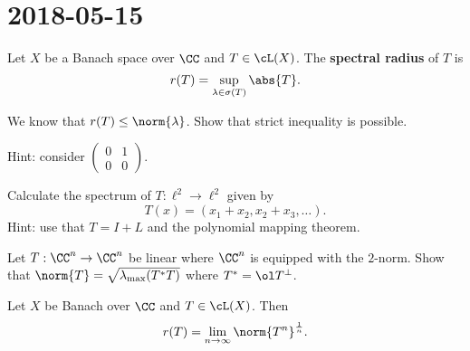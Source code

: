 \section{2018-05-15}

\begin{defn}
  Let $X$ be a Banach space over $\CC$ and $T \in \cL(X)$.
  The \textbf{spectral radius} of $T$ is
  \[ r(T) = \sup_{\lambda\in\sigma(T)}\abs{T}. \]
\end{defn}

\begin{exer}
  We know that $r(T) \leq \norm{\lambda}$.
  Show that strict inequality is possible.

  Hint: consider
  $(\begin{smallmatrix}
    0 & 1 \\ 0 & 0
  \end{smallmatrix})$.
\end{exer}

\begin{exer}
  Calculate the spectrum of $T: \ell^2 \to \ell^2$ given by
  \[ T(x) = (x_1+x_2,x_2+x_3,\ldots).\]
  Hint: use that $T=I+L$ and the polynomial mapping theorem.
\end{exer}

\begin{exer}
  Let $T: \CC^n \to \CC^n$ be linear where $\CC^n$ is equipped with the $2$-norm.
  Show that $\norm{T} = \sqrt{\lambda_{\text{max}}(T^*T)}$ where $T^*=\ol T^\perp$.
\end{exer}

\begin{thm}[Gelfand]
  Let $X$ be Banach over $\CC$ and $T \in \cL(X)$.
  Then
  \[ r(T) = \lim_{n\to\infty}\norm{T^n}^\frac 1n. \]
\end{thm}

